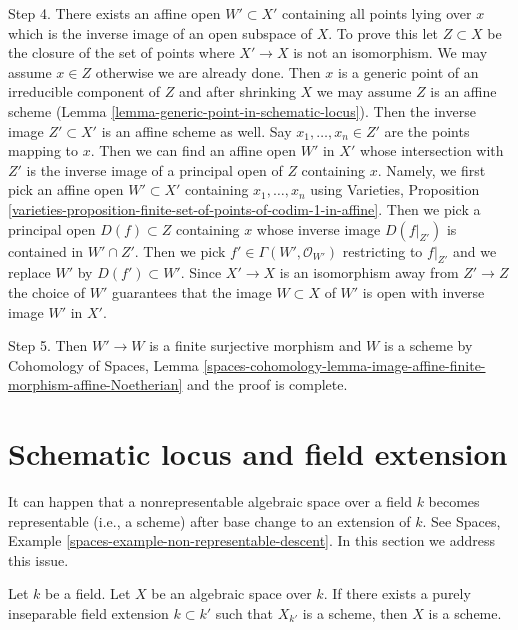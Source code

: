 \begin{remark}
\medskip\noindent
Step 4. There exists an affine open $W' \subset X'$ containing all points
lying over $x$ which is the inverse image of an open subspace of $X$.
To prove this let $Z \subset X$ be the closure of the set of points
where $X' \to X$ is not an isomorphism. We may assume $x \in Z$ otherwise
we are already done. Then $x$ is a generic point of an irreducible
component of $Z$ and after shrinking $X$ we may assume $Z$ is an affine scheme
(Lemma \ref{lemma-generic-point-in-schematic-locus}).
Then the inverse image $Z' \subset X'$ is an affine scheme as well.
Say $x_1, \ldots, x_n \in Z'$ are the points mapping to $x$.
Then we can find an affine open $W'$ in $X'$ whose intersection with
$Z'$ is the inverse image of a principal open of $Z$ containing $x$.
Namely, we first pick an affine open $W' \subset X'$ containing
$x_1, \ldots, x_n$ using Varieties, Proposition
\ref{varieties-proposition-finite-set-of-points-of-codim-1-in-affine}.
Then we pick a principal open $D(f) \subset Z$ containing $x$
whose inverse image $D(f|_{Z'})$ is contained in $W' \cap Z'$.
Then we pick $f' \in \Gamma(W', \mathcal{O}_{W'})$ restricting
to $f|_{Z'}$ and we replace $W'$ by $D(f') \subset W'$.
Since $X' \to X$ is an isomorphism away from $Z' \to Z$ the choice
of $W'$ guarantees that the image $W \subset X$ of $W'$ is open
with inverse image $W'$ in $X'$.

\medskip\noindent
Step 5. Then $W' \to W$ is a finite surjective morphism and $W$ is a scheme by
Cohomology of Spaces, Lemma
\ref{spaces-cohomology-lemma-image-affine-finite-morphism-affine-Noetherian}
and the proof is complete.
\end{remark}





\section{Schematic locus and field extension}
\label{section-schematic-and-field-extension}

\noindent
It can happen that a nonrepresentable algebraic space over a field $k$
becomes representable (i.e., a scheme) after base change to an extension
of $k$. See Spaces, Example \ref{spaces-example-non-representable-descent}.
In this section we address this issue.

\begin{lemma}
\label{lemma-scheme-after-purely-inseparable-base-change}
Let $k$ be a field. Let $X$ be an algebraic space over $k$.
If there exists a purely inseparable field extension $k \subset k'$
such that $X_{k'}$ is a scheme, then $X$ is a scheme.
\end{lemma}

